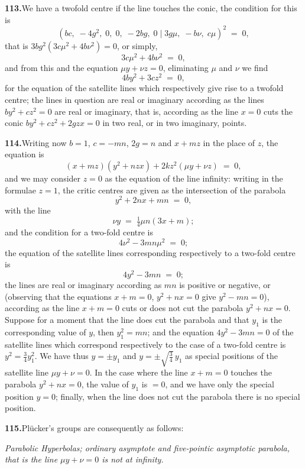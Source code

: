 \documentclass[11pt]{article}
\begin{document}
\medskip
\textbf{113.}\quad We have a twofold centre if the line touches the conic, the condition for this is
\[
(b c,\; -4 g^{2},\; 0,\; 0,\; -2 b g,\; 0 \mid 3 g \mu,\; -b \nu,\; c \mu)^{2} \;=\; 0,
\]
that is $3 b g^{2}(3 c \mu^{2} + 4 b \nu^{2}) = 0$, or simply,
\[
3 c \mu^{2} + 4 b \nu^{2} \;=\; 0,
\]
and from this and the equation $\mu y + \nu z = 0$, eliminating $\mu$ and $\nu$ we find
\[
4 b y^{2} + 3 c z^{2} \;=\; 0,
\]
for the equation of the satellite lines which respectively give rise to a twofold centre; the lines in question are real or imaginary according as the lines $b y^{2} + c z^{2} = 0$ are real or imaginary, that is, according as the line $x = 0$ cuts the conic $b y^{2} + c z^{2} + 2 g z x = 0$ in two real, or in two imaginary, points.

\medskip
\textbf{114.}\quad Writing now $b = 1$, $c = -m n$, $2 g = n$ and $x + m z$ in the place of $z$, the equation is
\[
(x + m z)(y^{2} + n z x) + 2 k z^{2}(\mu y + \nu z) \;=\; 0,
\]
and we may consider $z = 0$ as the equation of the line infinity: writing in the formulae $z = 1$, the critic centres are given as the intersection of the parabola
\[
y^{2} + 2 n x + m n \;=\; 0,
\]
with the line
\[
\nu y \;=\; \tfrac{1}{4} \mu n (3 x + m);
\]
and the condition for a two-fold centre is
\[
4 \nu^{2} - 3 m n \mu^{2} \;=\; 0;
\]
the equation of the satellite lines corresponding respectively to a two-fold centre is
\[
4 y^{2} - 3 m n \;=\; 0;
\]
the lines are real or imaginary according as $m n$ is positive or negative, or (observing that the equations $x + m = 0$, $y^{2} + n x = 0$ give $y^{2} - m n = 0$), according as the line $x + m = 0$ cuts or does not cut the parabola $y^{2} + n x = 0$. Suppose for a moment that the line does cut the parabola and that $y_{1}$ is the corresponding value of $y$, then $y_{1}^{2} = m n$; and the equation $4 y^{2} - 3 m n = 0$ of the satellite lines which correspond respectively to the case of a two-fold centre is $y^{2} = \tfrac{3}{4} y_{1}^{2}$. We have thus $y = \pm y_{1}$ and $y = \pm\sqrt{\tfrac{3}{4}}\, y_{1}$ as special positions of the satellite line $\mu y + \nu = 0$. In the case where the line $x + m = 0$ touches the parabola $y^{2} + n x = 0$, the value of $y_{1}$ is $= 0$, and we have only the special position $y = 0$; finally, when the line does not cut the parabola there is no special position.

\medskip
\textbf{115.}\quad Pl\"ucker's groups are consequently as follows:
\smallskip

\noindent\emph{Parabolic Hyperbolas; ordinary asymptote and five-pointic asymptotic parabola, that is the line $\mu y + \nu = 0$ is not at infinity.}
\end{document}
